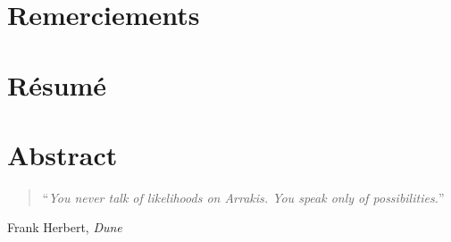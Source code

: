\chapter*{Remerciements}
    
\newpage
\chapter*{Résumé}

\newpage
\chapter*{Abstract}

\newpage
\vspace*{\fill} 
\begin{quote}
\vspace{1cm}
\centering
``\textit{You never talk of likelihoods on Arrakis. You speak only of possibilities.}''
\end{quote}
\vspace{0.5cm}
\begin{flushright}
Frank Herbert, \textit{Dune}
\end{flushright}
\vspace*{\fill}

\newpage